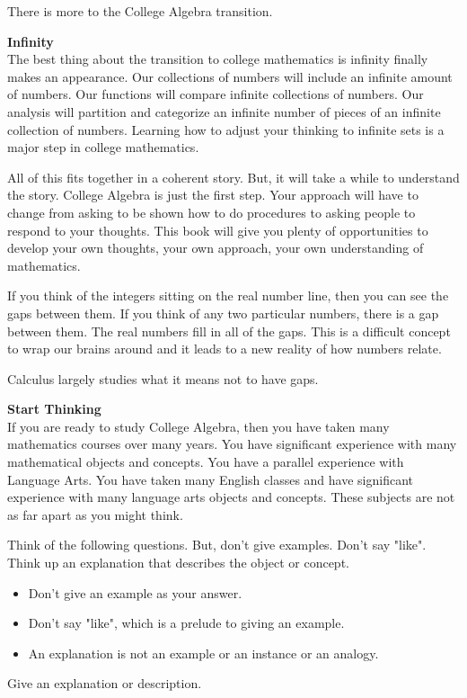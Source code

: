 \documentclass{ximera}
\begin{document}
There is more to the College Algebra transition.




\textbf{Infinity} \\ 
The best thing about the transition to college mathematics is infinity finally makes an appearance. Our collections of numbers will include an infinite amount of numbers. Our functions will compare infinite collections of numbers. Our analysis will partition and categorize an infinite number of pieces of an infinite collection of numbers. Learning how to adjust your thinking to infinite sets is a major step in college mathematics.

All of this fits together in a coherent story. But, it will take a while to understand the story.  College Algebra is just the first step. Your approach will have to change from asking to be shown how to do procedures to asking people to respond to your thoughts. This book will give you plenty of opportunities to develop your own thoughts, your own approach, your own understanding of mathematics.




\begin{idea}
If you think of the integers sitting on the real number line, then you can see the gaps between them. If you think of any two particular numbers, there is a gap between them. The real numbers fill in all of the gaps.  This is a difficult concept to wrap our brains around and it leads to a new reality of how numbers relate.

Calculus largely studies what it means not to have gaps.  

\end{idea}











\textbf{Start Thinking} \\ 
If you are ready to study College Algebra, then you have taken many mathematics courses over many years. You have significant experience with many mathematical objects and concepts. You have a parallel experience with Language Arts.  You have taken many English classes and have significant experience with many language arts objects and concepts. These subjects are not as far apart as you might think.

Think of the following questions. But, don't give examples. Don't say "like". Think up an explanation that describes the object or concept.  
\begin{itemize}
\item Don't give an example as your answer.
\item Don't say "like", which is a prelude to giving an example.
\item An explanation is not an example or an instance or an analogy.
\end{itemize}
Give an explanation or description.
\end{document}
